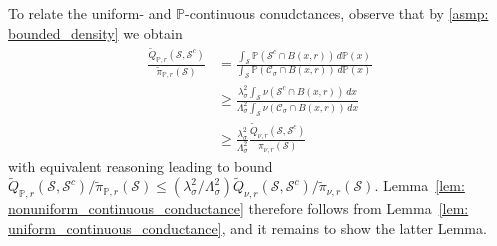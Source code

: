 \documentclass[11pt,twoside]{article}
\newcommand{\1}{\mathbf{1}}
\newcommand{\Pbb}{\mathbb{P}}
\newcommand{\Sset}{\mathcal{S}}
\newcommand{\Cset}{\mathcal{C}}
\newcommand{\Csig}{\Cset_{\sigma}}
\newcommand{\dx}{\,dx}
\newcommand{\piwt}{\widetilde{\pi}}
\begin{document}
To relate the uniform- and $\Pbb$-continuous conudctances, observe that by \ref{asmp: bounded_density} we obtain
\begin{align*}
\frac{\widetilde{Q}_{\Pbb,r}(\Sset,\Sset^c)}{\piwt_{\Pbb,r}(\Sset)} & = \frac{\int_{\Sset} \Pbb(\Sset^c \cap B(x,r)) \,d\Pbb(x)}{\int_{\Sset} \Pbb(\Csig \cap B(x,r)) \,d\Pbb(x)} \\
& \geq \frac{\lambda_{\sigma}^2 \int_{\Sset} \nu(\Sset^c \cap B(x,r)) \dx}{\Lambda_{\sigma}^2 \int_{\Sset} \nu(\Csig \cap B(x,r)) \dx} \\
& \geq \frac{\lambda_{\sigma}^2}{\Lambda_{\sigma}^2} \frac{\widetilde{Q}_{\nu,r}(\Sset,\Sset^c)}{\pi_{\nu,r}(\Sset)}
\end{align*}
with equivalent reasoning leading to bound $\widetilde{Q}_{\Pbb,r}(\Sset,\Sset^c)/\piwt_{\Pbb,r}(\Sset) \leq (\lambda_{\sigma}^2/\Lambda_{\sigma}^2) \widetilde{Q}_{\nu,r}(\Sset,\Sset^c)/\piwt_{\nu,r}(\Sset)$. Lemma~\ref{lem: nonuniform_continuous_conductance} therefore follows from Lemma~\ref{lem: uniform_continuous_conductance}, and it remains to show the latter Lemma.
\end{document}

